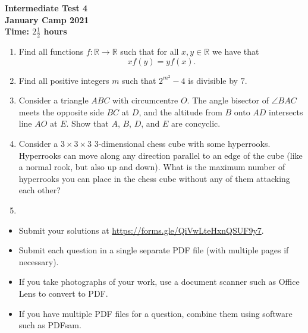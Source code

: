 \documentclass{article}
\begin{document}
\thispagestyle{empty}

\begin{center}
  \textbf{\Large Intermediate Test 4}
  \\ \vspace{1em}
  \textbf{\large January Camp 2021}
  \\ \vspace{1em}
  \textbf{\large Time: $2\frac{1}{2}$ hours}
\end{center}

\vspace{24pt}

\begin{enumerate}[1.]

\item %
Find all functions $f : \mathbb{R} \to \mathbb{R}$ such that for all $x, y \in \mathbb{R}$ we have that
\[ xf(y) = yf(x). \]


\item %
Find all positive integers $m$ such that $2^{m^2}-4$ is divisible by $7$.


\item %
Consider a triangle $ABC$ with circumcentre $O$.
The angle bisector of $\angle BAC$ meets the opposite side $BC$ at $D$, and the altitude from $B$ onto $AD$ intersects line $AO$ at $E$.
Show that $A$, $B$, $D$, and $E$ are concyclic.


\item %
Consider a $3\times3\times3$ 3-dimensional chess cube with some hyperrooks.
Hyperrooks can move along any direction parallel to an edge of the cube (like a normal rook, but also up and down).
What is the maximum number of hyperrooks you can place in the chess cube without any of them attacking each other?


\item %


\end{enumerate}


\vfill
\begin{itemize}
	\item Submit your solutions at \url{https://forms.gle/QiVwLteHxnQSUF9y7}.
	\item Submit each question in a single separate PDF file (with multiple pages if necessary).
	\item If you take photographs of your work, use a document scanner such as Office Lens to convert to PDF.
	\item If you have multiple PDF files for a question, combine them using software such as PDFsam.
\end{itemize}

\vfill
\centering
\begin{BVerbatim}
\end{BVerbatim}
\end{document}
